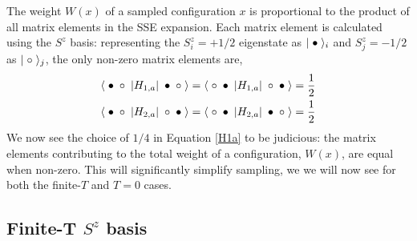 \documentclass[vecphys]{svmult}
\begin{document}
The weight $W(x)$ of a sampled configuration $x$ is proportional to the product of all matrix elements in the SSE expansion.  Each matrix element is calculated using the $S^z$ basis: representing the $S^z_i=+1/2$ eigenstate as $|\hspace{1mm} \bullet \hspace{1mm} \rangle_i$ and  $S^z_j=-1/2$ as $|\hspace{1mm} \circ \hspace{1mm} \rangle_j$, the only non-zero matrix elements are,
\begin{eqnarray}
\langle \hspace{1mm} \bullet \hspace{1mm}  \circ \hspace{1mm}  | H_{1,a} | \hspace{1mm} \bullet \hspace{1mm} \circ \hspace{1mm} \rangle = 
\langle \hspace{1mm} \circ \hspace{1mm}  \bullet \hspace{1mm}  | H_{1,a} | \hspace{1mm} \circ \hspace{1mm} \bullet \hspace{1mm} \rangle = \frac{1}{2} \label {Hdiag} \\
\langle \hspace{1mm} \bullet \hspace{1mm}  \circ \hspace{1mm}  | H_{2,a} | \hspace{1mm} \circ \hspace{1mm} \bullet \hspace{1mm} \rangle =
\langle \hspace{1mm} \circ \hspace{1mm}  \bullet \hspace{1mm}  | H_{2,a} | \hspace{1mm} \bullet \hspace{1mm} \circ \hspace{1mm} \rangle =
\frac{1}{2} \label{Hod}
\end{eqnarray} 
We now see the choice of $1/4$ in Equation \ref{H1a} to be judicious: the matrix elements contributing to the total weight of a configuration, $W(x)$, are equal when non-zero.  This will significantly simplify sampling, we we will now see for both the finite-$T$ and $T=0$ cases.


\subsection{Finite-T $S^z$ basis} \label{HeisfiniteT}
\end{document}
